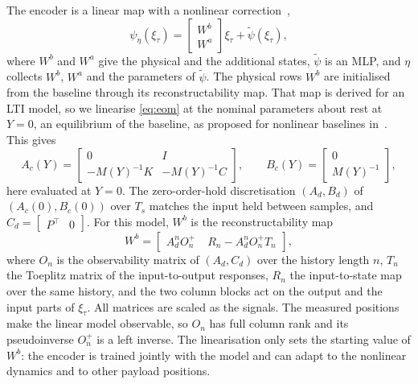 The encoder is a linear map with a nonlinear
correction~\cite[Eq.~(8)]{hoekstra2026encoder},
\begin{equation}
 \psi_\eta(\xi_\tau)
 =\begin{bmatrix}W^b\\ W^a\end{bmatrix}\xi_\tau+\tilde\psi(\xi_\tau),
 \label{eq:aug_enc_lin}
\end{equation}
where $W^b$ and $W^a$ give the physical and the additional states,
$\tilde\psi$ is an MLP, and $\eta$ collects $W^b$, $W^a$ and the parameters
of $\tilde\psi$.
The physical rows $W^b$ are initialised from the baseline through its
reconstructability map.
That map is derived for an LTI model, so we linearise \eqref{eq:eom} at the
nominal parameters about rest at $Y=0$, an equilibrium of the baseline, as
proposed for nonlinear baselines
in~\cite[Eqs.~(30), (31)]{hoekstra2026encoder}.
This gives
\begin{equation}
 A_c(Y)=\begin{bmatrix}0 & I\\ -M(Y)^{-1}K & -M(Y)^{-1}C\end{bmatrix},\qquad
 B_c(Y)=\begin{bmatrix}0\\ M(Y)^{-1}\end{bmatrix},
\label{eq:aug_lin}
\end{equation}
here evaluated at $Y=0$.
The zero-order-hold discretisation $(A_d,B_d)$ of $(A_c(0),B_c(0))$ over
$T_s$ matches the input held between samples, and
$C_d=\begin{bmatrix}P^\top & 0\end{bmatrix}$.
For this model, $W^b$ is the reconstructability
map~\cite[Eqs.~(16), (17)]{hoekstra2026encoder}
\begin{equation}
 W^b=\begin{bmatrix}
  A_d^nO_n^{+} & \;R_n-A_d^nO_n^{+}T_n
 \end{bmatrix},
 \label{eq:aug_wb}
\end{equation}
where $O_n$ is the observability matrix of $(A_d,C_d)$ over the history
length $n$, $T_n$ the Toeplitz matrix of the input-to-output responses,
$R_n$ the input-to-state map over the same history, and the two column blocks
act on the output and the input parts of $\xi_\tau$.
All matrices are scaled as the signals.
The measured positions make the linear model observable, so $O_n$ has full
column rank and its pseudoinverse $O_n^{+}$ is a left inverse.
The linearisation only sets the starting value of $W^b$: the encoder is
trained jointly with the model and can adapt to the nonlinear dynamics and to
other payload positions.

